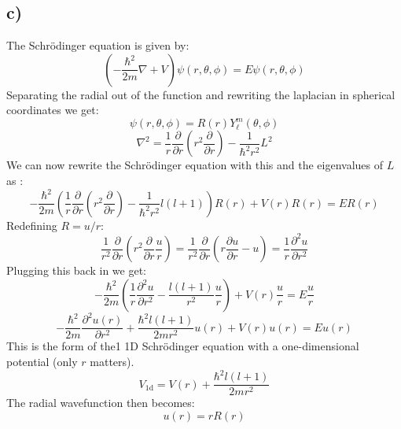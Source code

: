 \documentclass{article}
\begin{document}
\subsection*{c)}
The Schrödinger equation is given by:
\[
\left(- \frac{ℏ^2}{2m}∇ + V\right)ψ(r, θ, ϕ) = Eψ(r, θ, ϕ)
\]
Separating the radial out of the function and rewriting the laplacian in spherical coordinates we get:
\[
ψ(r, θ, ϕ) = R(r) Y_{ℓ}^{m} (θ, ϕ)
\]
\[
∇^2 = \frac{1}{r} \frac{∂ }{∂ r} \left(r^2 \frac{∂ }{∂ r}\right) - \frac{1}{ℏ^2r^2}L^2
\]
We can now rewrite the Schrödinger equation with this and the eigenvalues of $L$ as :
\[
- \frac{ℏ^2}{2m} \left(\frac{1}{r} \frac{∂ }{∂ r} \left(r^2 \frac{∂ }{∂ r}\right) - \frac{1}{ℏ^2r^2}l(l+1)\right)R(r) + V(r) R(r) = ER(r)
\]
Redefining $R = u / r$:
\[
\frac{1}{r^2}\frac{∂ }{∂ r} \left(r^2 \frac{∂ }{∂ r} \frac{u}{r}\right) = \frac{1}{r^2} \frac{∂ }{∂ r}\left(r \frac{∂ u}{∂ r} - u\right) = \frac{1}{r} \frac{∂^2 u}{∂ r^2}
\]
Plugging this back in we get:
\[
- \frac{ℏ^2}{2m} \left(\frac{1}{r} \frac{∂^2 u}{∂ r^2} - \frac{l(l+1)}{r^2}\frac{u}{r}\right) + V(r) \frac{u}{r} = E \frac{u}{r}
\]
\[
- \frac{ℏ^2}{2m} \frac{∂^2 u(r)}{∂ r^2} + \frac{ℏ^2l(l+1)}{2mr^2} u(r) + V(r)u(r)=  Eu(r)
\]
This is the form of the1 1D Schrödinger equation with a one-dimensional potential (only $r$ matters). 
\[
V_{1\mathrm{d}} = V(r) + \frac{ℏ^2 l(l+1)}{2mr^2}
\]
The radial wavefunction then becomes:
\[
u(r) = rR(r)
\]
\end{document}
